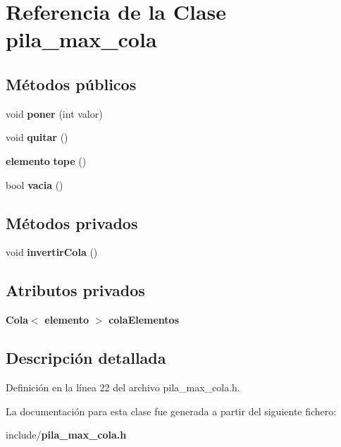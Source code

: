 \section{Referencia de la Clase pila\-\_\-max\-\_\-cola}
\label{classpila__max__cola}
\subsection*{Métodos públicos}
\begin{DoxyCompactItemize}
\item 
void {\bfseries poner} (int valor)\label{classpila__max__cola_a800dedfc16a056ffc415d29ef3af572e}

\item 
void {\bfseries quitar} ()\label{classpila__max__cola_af51be909f11734dacfe2a87d2e21a41d}

\item 
{\bf elemento} {\bfseries tope} ()\label{classpila__max__cola_afd3dbab2dc7134d6c415829cbc834ea2}

\item 
bool {\bfseries vacia} ()\label{classpila__max__cola_aaa2e5ab608ac412cc95a46b83837ce04}

\end{DoxyCompactItemize}
\subsection*{Métodos privados}
\begin{DoxyCompactItemize}
\item 
void {\bfseries invertir\-Cola} ()\label{classpila__max__cola_add62b3c65a1bace93f14be10fb28d489}

\end{DoxyCompactItemize}
\subsection*{Atributos privados}
\begin{DoxyCompactItemize}
\item 
{\bf Cola}$<$ {\bf elemento} $>$ {\bfseries cola\-Elementos}\label{classpila__max__cola_a00308027a3c3fb38e4caf4e7a95a21e9}

\end{DoxyCompactItemize}


\subsection{Descripción detallada}


Definición en la línea 22 del archivo pila\-\_\-max\-\_\-cola.\-h.



La documentación para esta clase fue generada a partir del siguiente fichero\-:\begin{DoxyCompactItemize}
\item 
include/{\bf pila\-\_\-max\-\_\-cola.\-h}\end{DoxyCompactItemize}
